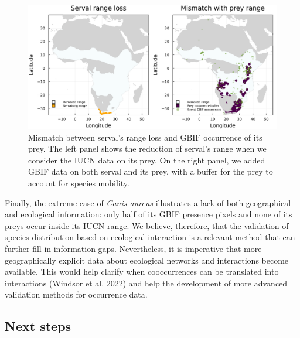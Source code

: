 \documentclass[10pt,oneside]{article}
\makeatletter
\def\maxwidth{\ifdim\Gin@nat@width>\linewidth\linewidth
\else\Gin@nat@width\fi}
\let\Oldincludegraphics\includegraphics
\renewcommand{\includegraphics}[1]{\Oldincludegraphics[width=\maxwidth]{#1}}
\makeatother
\begin{document}
\begin{figure}
\hypertarget{fig:serval}{%
\centering
\includegraphics{figures/serval_mismatch_combined.png}
\caption{Mismatch between serval's range loss and GBIF occurrence of its
prey. The left panel shows the reduction of serval's range when we
consider the IUCN data on its prey. On the right panel, we added GBIF
data on both serval and its prey, with a buffer for the prey to account
for species mobility.}\label{fig:serval}
}
\end{figure}

Finally, the extreme case of \emph{Canis aureus} illustrates a lack of
both geographical and ecological information: only half of its GBIF
presence pixels and none of its preys occur inside its IUCN range. We
believe, therefore, that the validation of species distribution based on
ecological interaction is a relevant method that can further fill in
information gaps. Nevertheless, it is imperative that more
geographically explicit data about ecological networks and interactions
become available. This would help clarify when cooccurrences can be
translated into interactions (Windsor et al. 2022) and help the
development of more advanced validation methods for occurrence data.

\hypertarget{next-steps}{%
\subsection{Next steps}\label{next-steps}}
\end{document}
